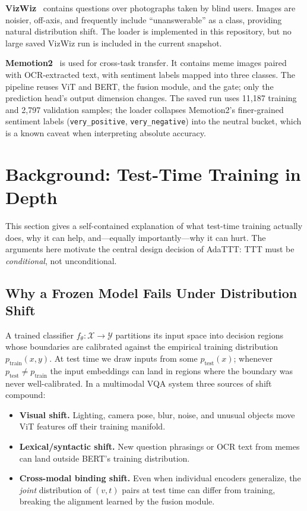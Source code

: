 \documentclass[conference]{IEEEtran}
\begin{document}
\textbf{VizWiz}~\cite{b2} contains questions over photographs taken by
blind users. Images are noisier, off-axis, and frequently include
``unanswerable'' as a class, providing natural distribution shift. The
loader is implemented in this repository, but no large saved VizWiz run
is included in the current snapshot.

\textbf{Memotion2}~\cite{b3} is used for cross-task transfer. It contains
meme images paired with OCR-extracted text, with sentiment labels mapped
into three classes. The pipeline reuses ViT and BERT, the fusion module,
and the gate; only the prediction head's output dimension changes. The
saved run uses 11{,}187 training and 2{,}797 validation samples; the
loader collapses Memotion2's finer-grained sentiment labels
(\texttt{very\_positive}, \texttt{very\_negative}) into the neutral
bucket, which is a known caveat when interpreting absolute accuracy.

\section{Background: Test-Time Training in Depth}
\label{sec:ttt-bg}

This section gives a self-contained explanation of what test-time training
actually does, why it can help, and---equally importantly---why it can
hurt. The arguments here motivate the central design decision of AdaTTT:
TTT must be \emph{conditional}, not unconditional.

\subsection{Why a Frozen Model Fails Under Distribution Shift}

A trained classifier $f_{\theta} : \mathcal{X} \to \mathcal{Y}$ partitions
its input space into decision regions whose boundaries are calibrated
against the empirical training distribution $p_{\mathrm{train}}(x,y)$.
At test time we draw inputs from some $p_{\mathrm{test}}(x)$; whenever
$p_{\mathrm{test}} \ne p_{\mathrm{train}}$ the input embeddings can land
in regions where the boundary was never well-calibrated. In a multimodal
VQA system three sources of shift compound:

\begin{itemize}
\item \textbf{Visual shift.} Lighting, camera pose, blur, noise, and
unusual objects move ViT features off their training manifold.
\item \textbf{Lexical/syntactic shift.} New question phrasings or OCR
text from memes can land outside BERT's training distribution.
\item \textbf{Cross-modal binding shift.} Even when individual encoders
generalize, the \emph{joint} distribution of $(v, t)$ pairs at test time
can differ from training, breaking the alignment learned by the fusion
module.
\end{itemize}
\end{document}
